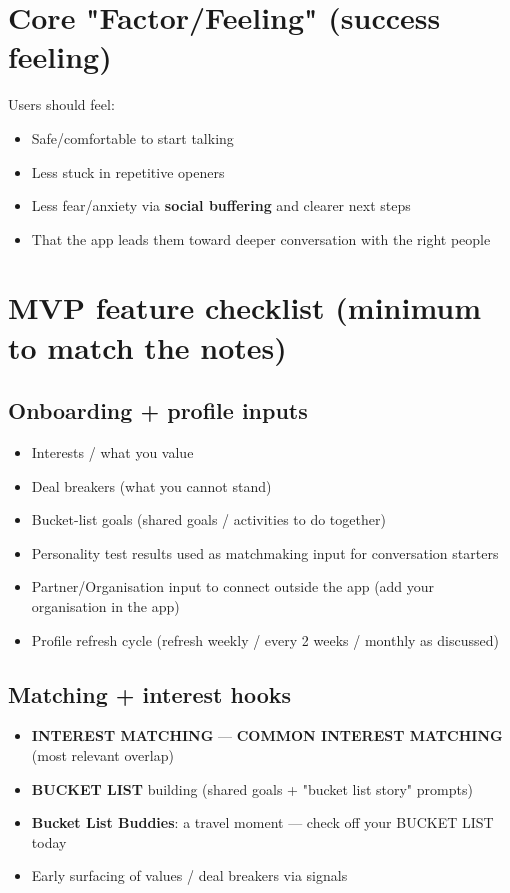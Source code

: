 \documentclass[10pt,a4paper]{article}
\begin{document}
\section*{\color{eublue}Core "Factor/Feeling" (success feeling)}

Users should feel:
\begin{itemize}
\item Safe/comfortable to start talking
\item Less stuck in repetitive openers
\item Less fear/anxiety via \textbf{social buffering} and clearer next steps
\item That the app leads them toward deeper conversation with the right people
\end{itemize}

\section*{\color{eublue}MVP feature checklist (minimum to match the notes)}

\subsection*{\color{eublue}Onboarding + profile inputs}
\begin{itemize}
\item Interests / what you value
\item Deal breakers (what you cannot stand)
\item Bucket-list goals (shared goals / activities to do together)
\item Personality test results used as matchmaking input for conversation starters
\item Partner/Organisation input to connect outside the app (add your organisation in the app)
\item Profile refresh cycle (refresh weekly / every 2 weeks / monthly as discussed)
\end{itemize}

\subsection*{\color{eublue}Matching + interest hooks}
\begin{itemize}
\item \textbf{INTEREST MATCHING} --- \textbf{COMMON INTEREST MATCHING} (most relevant overlap)
\item \textbf{BUCKET LIST} building (shared goals + "bucket list story" prompts)
\item \textbf{Bucket List Buddies}: a travel moment --- check off your BUCKET LIST today
\item Early surfacing of values / deal breakers via signals
\end{itemize}
\end{document}
